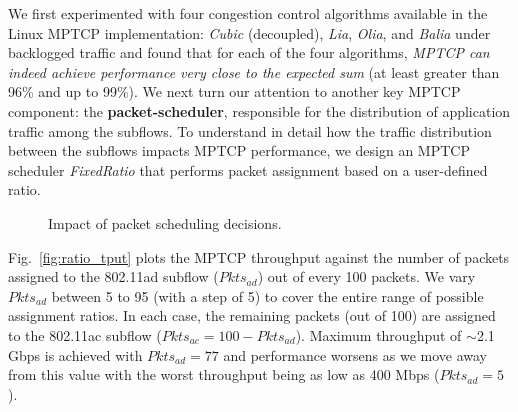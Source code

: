 We first experimented with four congestion control algorithms available in the
Linux MPTCP implementation: \emph{Cubic} (decoupled), \emph{Lia}, 
\emph{Olia}, and \emph{Balia} under backlogged
traffic and found that for each of the four algorithms, \textit{MPTCP
can indeed achieve performance very close to the expected sum} (at
least greater than 96\% and up to 99\%). We next turn our attention to
another key MPTCP component: the \textbf{packet-scheduler},
responsible for the distribution of application traffic among the
subflows. To understand in detail how the traffic distribution between
the subflows impacts MPTCP performance, we design an MPTCP
scheduler \emph{FixedRatio} that performs packet assignment based on a
user-defined ratio.

\begin{figure}[t]
    \centering
    \hfill
    \vspace{-0.2in}
    \caption{Impact of packet scheduling decisions.}
    \vspace{-0.22in}
\end{figure}

Fig.~\ref{fig:ratio_tput} plots the MPTCP throughput against the
number of packets assigned to the 802.11ad subflow ($Pkts_{ad}$) out
of every 100 packets. We vary $Pkts_{ad}$ between 5 to 95 (with a step
of 5) to cover the entire range of possible assignment ratios. In each
case, the remaining packets (out of 100) are assigned to the 802.11ac
subflow ($Pkts_{ac}=100-Pkts_{ad}$). Maximum throughput of $\sim$2.1
Gbps is achieved with $Pkts_{ad}=77$ and performance worsens as we
move away from this value with the worst throughput being as low as
400 Mbps ($Pkts_{ad}=5$).

